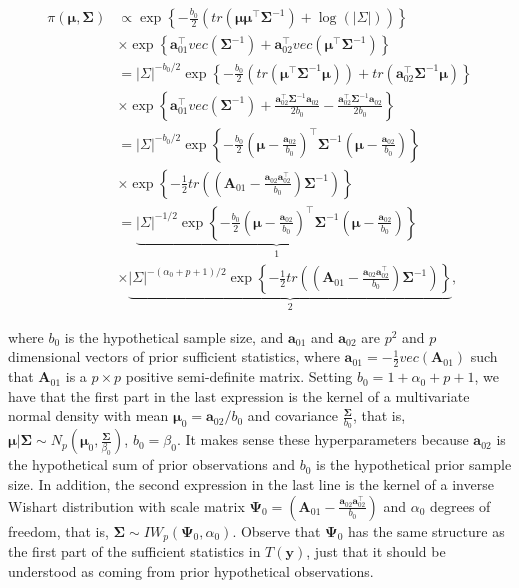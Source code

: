 \begin{enumerate}
\begin{align}
	\pi(\bm{\mu},\bm{\Sigma})&\propto \exp\left\{-\frac{b_0}{2}\left(tr\left(\bm{\mu}\bm{\mu}^{\top}\bm{\Sigma}^{-1}\right)+\log(|\Sigma|)\right)\right\}\nonumber\\
	&\times \exp\left\{\mathbf{a}_{01}^{\top} vec\left(\bm{\Sigma}^{-1}\right)+\mathbf{a}_{02}^{\top}vec\left(\bm{\mu}^{\top}\bm{\Sigma}^{-1}\right)\right\}\nonumber\\
	&=|\Sigma|^{-b_0/2}\exp\left\{-\frac{b_0}{2}\left(tr\left(\bm{\mu}^{\top}\bm{\Sigma}^{-1}\bm{\mu}\right)\right)+tr\left(\mathbf{a}_{02}^{\top}\bm{\Sigma}^{-1}\bm{\mu}\right)\right\}\nonumber\\
	&\times \exp\left\{\mathbf{a}_{01}^{\top} vec\left(\bm{\Sigma}^{-1}\right)+\frac{\mathbf{a}_{02}^{\top}\bm{\Sigma}^{-1}\mathbf{a}_{02}}{2b_0}-\frac{\mathbf{a}_{02}^{\top}\bm{\Sigma}^{-1}\mathbf{a}_{02}}{2b_0}\right\}\nonumber\\
	&=|\Sigma|^{-b_0/2}\exp\left\{-\frac{b_0}{2}\left(\bm{\mu}-\frac{\mathbf{a}_{02}}{b_0}\right)^{\top}\bm{\Sigma}^{-1}\left(\bm{\mu}-\frac{\mathbf{a}_{02}}{b_0}\right)\right\}\nonumber\\
	&\times \exp\left\{-\frac{1}{2}tr\left(\left(\mathbf{A}_{01}-\frac{\mathbf{a}_{02}\mathbf{a}_{02}^{\top}}{b_0}\right)\bm{\Sigma}^{-1}\right)\right\}\nonumber\\
	&=\underbrace{|\Sigma|^{-1/2}\exp\left\{-\frac{b_0}{2}\left(\bm{\mu}-\frac{\mathbf{a}_{02}}{b_0}\right)^{\top}\bm{\Sigma}^{-1}\left(\bm{\mu}-\frac{\mathbf{a}_{02}}{b_0}\right)\right\}}_1\nonumber\\
	&\times \underbrace{|\Sigma|^{-(\alpha_0+p+1)/2}\exp\left\{-\frac{1}{2}tr\left(\left(\mathbf{A}_{01}-\frac{\mathbf{a}_{02}\mathbf{a}_{02}^{\top}}{b_0}\right)\bm{\Sigma}^{-1}\right)\right\}}_2,\nonumber
\end{align}

where $b_0$ is the hypothetical sample size, and $\mathbf{a}_{01}$ and $\mathbf{a}_{02}$ are $p^2$ and $p$ dimensional vectors of prior sufficient statistics, where $\mathbf{a}_{01}=-\frac{1}{2}vec(\mathbf{A}_{01})$ such that $\mathbf{A}_{01}$ is a $p\times p$ positive semi-definite matrix. Setting $b_0=1+\alpha_0+p+1$, we have that the first part in the last expression is the kernel of a multivariate normal density with mean $\bm{\mu}_0=\mathbf{a}_{02}/b_0$ and covariance $\frac{\bm{\Sigma}}{b_0}$, that is, $\bm{\mu}|\bm{\Sigma}\sim N_p\left(\bm{\mu}_0,\frac{\bm{\Sigma}}{\beta_0}\right)$, $b_0=\beta_0$. It makes sense these hyperparameters because $\mathbf{a}_{02}$ is the hypothetical sum of prior observations and $b_0$ is the hypothetical prior sample size. In addition, the second expression in the last line is the kernel of a inverse Wishart distribution with scale matrix $\mathbf{\Psi}_0=\left(\mathbf{A}_{01}-\frac{\mathbf{a}_{02}\mathbf{a}_{02}^{\top}}{b_0}\right)$ and $\alpha_0$ degrees of freedom, that is, $\bm{\Sigma}\sim IW_p(\mathbf{\Psi}_0,\alpha_0)$. Observe that $\mathbf{\Psi}_0$ has the same structure as the first part of the sufficient statistics in $T(\mathbf{y})$, just that it should be understood as coming from prior hypothetical observations.


\end{enumerate}
